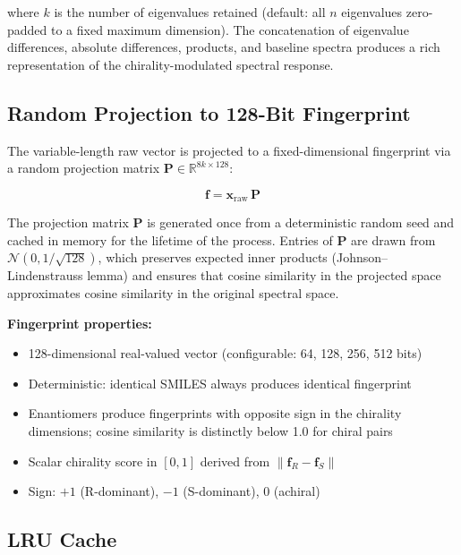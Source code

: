 \documentclass[11pt,a4paper]{article}
\begin{document}
where $k$ is the number of eigenvalues retained (default: all $n$ eigenvalues
zero-padded to a fixed maximum dimension). The concatenation of eigenvalue
differences, absolute differences, products, and baseline spectra produces a
rich representation of the chirality-modulated spectral response.

\subsection{Random Projection to 128-Bit Fingerprint}

The variable-length raw vector is projected to a fixed-dimensional fingerprint
via a random projection matrix $\mathbf{P} \in \mathbb{R}^{8k \times 128}$:

\begin{equation}
  \mathbf{f} = \mathbf{x}_{\text{raw}} \, \mathbf{P}
\end{equation}

The projection matrix $\mathbf{P}$ is generated once from a deterministic
random seed and cached in memory for the lifetime of the process. Entries of
$\mathbf{P}$ are drawn from $\mathcal{N}(0, 1/\sqrt{128})$, which preserves
expected inner products (Johnson--Lindenstrauss lemma) and ensures that cosine
similarity in the projected space approximates cosine similarity in the original
spectral space.

\begin{keyresult}
\textbf{Fingerprint properties:}
\begin{itemize}[leftmargin=1.5em, itemsep=2pt]
  \item 128-dimensional real-valued vector (configurable: 64, 128, 256, 512 bits)
  \item Deterministic: identical SMILES always produces identical fingerprint
  \item Enantiomers produce fingerprints with opposite sign in the chirality
    dimensions; cosine similarity is distinctly below 1.0 for chiral pairs
  \item Scalar chirality score in $[0, 1]$ derived from $\|\mathbf{f}_R - \mathbf{f}_S\|$
  \item Sign: $+1$ (R-dominant), $-1$ (S-dominant), $0$ (achiral)
\end{itemize}
\end{keyresult}

\subsection{LRU Cache}
\end{document}
